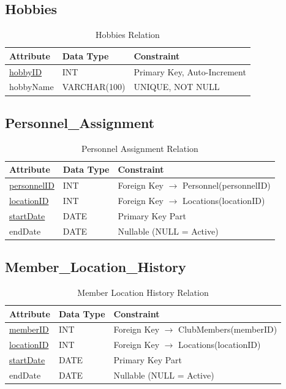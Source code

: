 \documentclass[11pt,a4paper]{article}
\begin{document}
\subsection{Hobbies}

\begin{table}[H]
\centering
\begin{tabular}{lll}
\toprule
Attribute & Data Type & Constraint \\
\midrule
\underline{hobbyID} & INT & Primary Key, Auto-Increment \\
hobbyName & VARCHAR(100) & UNIQUE, NOT NULL \\
\bottomrule
\end{tabular}
\caption{Hobbies Relation}
\end{table}


\subsection{Personnel\_Assignment}

\begin{table}[H]
\centering
\begin{tabular}{lll}
\toprule
Attribute & Data Type & Constraint \\
\midrule
\underline{personnelID} & INT & Foreign Key $\rightarrow$ Personnel(personnelID) \\
\underline{locationID} & INT & Foreign Key $\rightarrow$ Locations(locationID) \\
\underline{startDate} & DATE & Primary Key Part \\
endDate & DATE & Nullable (NULL = Active) \\
\bottomrule
\end{tabular}
\caption{Personnel Assignment Relation}
\end{table}


\subsection{Member\_Location\_History}

\begin{table}[H]
\centering
\begin{tabular}{lll}
\toprule
Attribute & Data Type & Constraint \\
\midrule
\underline{memberID} & INT & Foreign Key $\rightarrow$ ClubMembers(memberID) \\
\underline{locationID} & INT & Foreign Key $\rightarrow$ Locations(locationID) \\
\underline{startDate} & DATE & Primary Key Part \\
endDate & DATE & Nullable (NULL = Active) \\
\bottomrule
\end{tabular}
\caption{Member Location History Relation}
\end{table}
\end{document}
